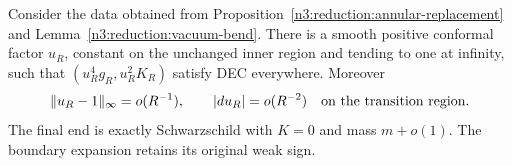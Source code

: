 \begin{lemma}
\label{n3:reduction:radial-repair}
Consider the data obtained from
Proposition~\ref{n3:reduction:annular-replacement} and
Lemma~\ref{n3:reduction:vacuum-bend}.  There is a smooth positive conformal
factor $u_R$, constant on the unchanged inner region and tending to one
at infinity, such that $(u_R^4g_R,u_R^2K_R)$ satisfy DEC everywhere.
Moreover
\begin{equation}
 \label{n3:reduction:repair-size}
 \|u_R-1\|_\infty=o(R^{-1}),\qquad
 |du_R|=o(R^{-2})\quad\hbox{on the transition region}.
\end{equation}
The final end is exactly Schwarzschild with $K=0$ and mass
$m+o(1)$.  The boundary expansion retains its original weak sign.
\end{lemma}

